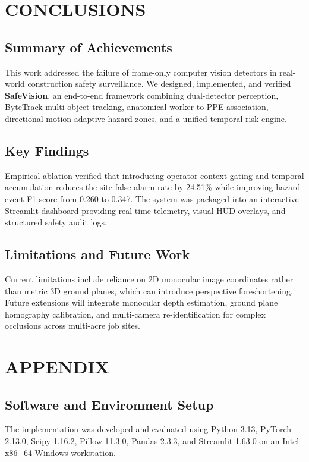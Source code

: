 \documentclass[letterpaper, 10 pt, conference]{ieeeconf}
\begin{document}
\section{CONCLUSIONS}

\subsection{Summary of Achievements}
This work addressed the failure of frame-only computer vision detectors in real-world construction safety surveillance. We designed, implemented, and verified \textbf{SafeVision}, an end-to-end framework combining dual-detector perception, ByteTrack multi-object tracking, anatomical worker-to-PPE association, directional motion-adaptive hazard zones, and a unified temporal risk engine.

\subsection{Key Findings}
Empirical ablation verified that introducing operator context gating and temporal accumulation reduces the site false alarm rate by 24.51\% while improving hazard event F1-score from 0.260 to 0.347. The system was packaged into an interactive Streamlit dashboard providing real-time telemetry, visual HUD overlays, and structured safety audit logs.

\subsection{Limitations and Future Work}
Current limitations include reliance on 2D monocular image coordinates rather than metric 3D ground planes, which can introduce perspective foreshortening. Future extensions will integrate monocular depth estimation, ground plane homography calibration, and multi-camera re-identification for complex occlusions across multi-acre job sites.

\addtolength{\textheight}{-4cm}

\section*{APPENDIX}

\subsection{Software and Environment Setup}
The implementation was developed and evaluated using Python 3.13, PyTorch 2.13.0, Scipy 1.16.2, Pillow 11.3.0, Pandas 2.3.3, and Streamlit 1.63.0 on an Intel x86\_64 Windows workstation.
\end{document}
